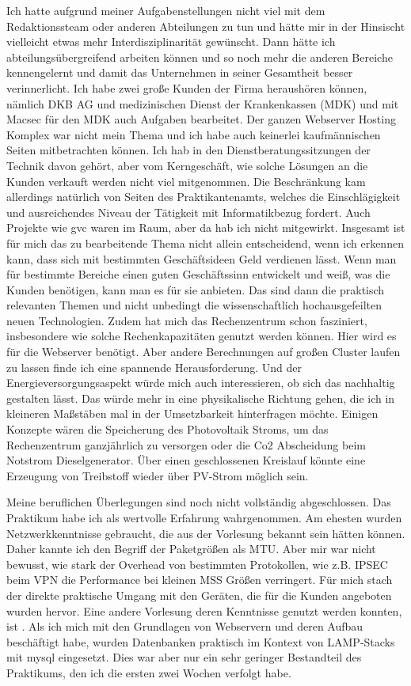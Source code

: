 \documentclass[english,runningheads,a4paper]{llncs}[2018/03/10]
\begin{document}
Ich hatte aufgrund meiner Aufgabenstellungen nicht viel mit dem Redaktionssteam oder anderen Abteilungen zu tun und hätte mir in der Hinsischt vielleicht etwas mehr Interdisziplinarität gewünscht. Dann hätte ich abteilungsübergreifend arbeiten können und so noch mehr die anderen Bereiche kennengelernt und damit das Unternehmen in seiner Gesamtheit besser verinnerlicht. Ich habe zwei große Kunden der Firma heraushören können, nämlich DKB AG und medizinischen Dienst der Krankenkassen (MDK) und mit Macsec für den MDK auch Aufgaben bearbeitet. Der ganzen Webserver Hosting Komplex war nicht mein Thema und ich habe auch keinerlei kaufmännischen Seiten mitbetrachten können. Ich hab in den Dienstberatungssitzungen der Technik davon gehört, aber vom Kerngeschäft, wie solche Lösungen an die Kunden verkauft werden nicht viel mitgenommen. Die Beschränkung  kam allerdings natürlich von Seiten des Praktikantenamts, welches die Einschlägigkeit und ausreichendes Niveau der Tätigkeit mit Informatikbezug fordert. Auch Projekte wie gvc waren im Raum, aber da hab ich nicht mitgewirkt. Insgesamt ist für mich das zu bearbeitende Thema nicht allein entscheidend, wenn ich erkennen kann, dass sich mit bestimmten Geschäftsideen Geld verdienen lässt. Wenn man für bestimmte Bereiche einen guten Geschäftssinn entwickelt und weiß, was die Kunden benötigen, kann man es für sie anbieten. Das sind dann die praktisch relevanten Themen und nicht unbedingt die wissenschaftlich hochausgefeilten neuen Technologien. 
Zudem hat mich das Rechenzentrum schon fasziniert, insbesondere wie solche Rechenkapazitäten genutzt werden können. Hier wird es für die Webserver benötigt. Aber andere Berechnungen auf großen Cluster laufen zu lassen finde ich eine spannende Herausforderung. Und der Energieversorgungsaspekt würde mich auch interessieren, ob sich das nachhaltig gestalten lässt. Das würde mehr in eine physikalische Richtung gehen, die ich in kleineren Maßstäben mal in der Umsetzbarkeit hinterfragen möchte. Einigen Konzepte wären die Speicherung des Photovoltaik Stroms, um das Rechenzentrum ganzjährlich zu versorgen oder die Co2 Abscheidung beim Notstrom Dieselgenerator. Über einen geschlossenen Kreislauf könnte eine Erzeugung von Treibstoff wieder über PV-Strom möglich sein.


Meine beruflichen Überlegungen sind noch nicht vollständig abgeschlossen. Das Praktikum habe ich als wertvolle Erfahrung wahrgenommen.
Am ehesten wurden Netzwerkkenntnisse gebraucht, die aus der Vorlesung  bekannt sein hätten können. Daher kannte ich den Begriff der Paketgrößen als MTU. Aber mir war nicht bewusst, wie stark der Overhead von bestimmten Protokollen, wie z.B. IPSEC beim VPN die Performance bei kleinen MSS Größen verringert. Für mich stach der direkte praktische Umgang mit den Geräten, die für die Kunden angeboten wurden hervor. 
Eine andere Vorlesung deren Kenntnisse genutzt werden konnten, ist . Als ich mich mit den Grundlagen von Webservern und deren Aufbau beschäftigt habe, wurden Datenbanken praktisch im Kontext von LAMP-Stacks mit mysql eingesetzt. Dies war aber nur ein sehr geringer Bestandteil des Praktikums, den ich die ersten zwei Wochen verfolgt habe.
\end{document}
